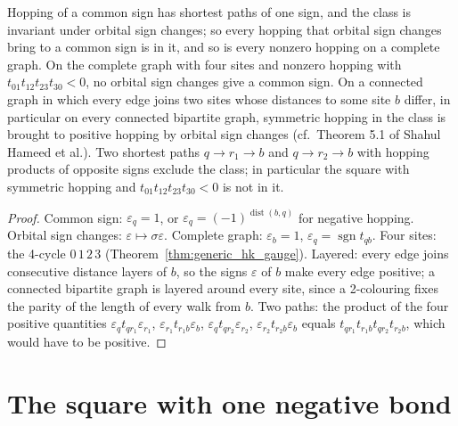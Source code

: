 \begin{theorem}
  \label{thm:shortest_class}
  \leanok
  Hopping of a common sign has shortest paths of one sign, and the class is invariant under orbital sign changes;
  so every hopping that orbital sign changes bring to a common sign is in it, and so is every nonzero hopping on a
  complete graph. On the complete graph with four sites and nonzero hopping with $t_{01}t_{12}t_{23}t_{30}<0$, no
  orbital sign changes give a common sign. On a connected graph in which every edge joins two sites whose distances
  to some site $b$ differ, in particular on every connected bipartite graph, symmetric hopping in the class is
  brought to positive hopping by orbital sign changes (cf.\ Theorem 5.1 of Shahul Hameed et al.). Two
  shortest paths $q\to r_1\to b$ and $q\to r_2\to b$ with hopping products of opposite signs exclude the class; in
  particular the square with symmetric hopping and $t_{01}t_{12}t_{23}t_{30}<0$ is not in it.
\end{theorem}
\begin{proof}
  \leanok
  Common sign: $\varepsilon_q=1$, or $\varepsilon_q=(-1)^{\operatorname{dist}(b,q)}$ for negative hopping. Orbital
  sign changes: $\varepsilon\mapsto\sigma\varepsilon$. Complete graph: $\varepsilon_b=1$,
  $\varepsilon_q=\operatorname{sgn}t_{qb}$. Four sites: the 4-cycle $0\,1\,2\,3$
  (Theorem~\ref{thm:generic_hk_gauge}). Layered: every edge joins consecutive distance layers of $b$, so the
  signs $\varepsilon$ of $b$ make every edge positive; a connected bipartite graph is layered around every site,
  since a 2-colouring fixes the parity of the length of every walk from $b$. Two paths: the product of the four positive
  quantities $\varepsilon_qt_{qr_1}\varepsilon_{r_1}$, $\varepsilon_{r_1}t_{r_1b}\varepsilon_b$,
  $\varepsilon_qt_{qr_2}\varepsilon_{r_2}$, $\varepsilon_{r_2}t_{r_2b}\varepsilon_b$ equals
  $t_{qr_1}t_{r_1b}t_{qr_2}t_{r_2b}$, which would have to be positive.
\end{proof}

\section{The square with one negative bond}

